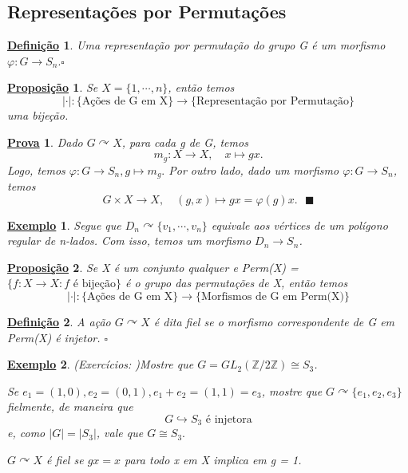 \documentclass{article}
\newtheorem*{def*}{\underline{Defini\c c\~ao}}
\newtheorem*{prop*}{\underline{Proposi\c c\~ao}}
\newtheorem{example*}{\underline{Exemplo}}
\newtheorem*{proof*}{\underline{Prova}}
\renewcommand\qedsymbol{$\blacksquare$}
\begin{document}
\subsection{Representa\c cões por Permuta\c cões}
 \begin{def*}
   Uma representa\c cão por permuta\c cão do grupo G é um morfismo \(\varphi :G\rightarrow S_{n}. \square\)
 \end{def*}
\begin{prop*}
  Se \(X = \{1, \cdots, n\}\), então temos 
    \[
      |\cdot |:\biggl\{\text{A\c cões de G em X}\biggr\}\rightarrow \biggl\{\text{Representa\c cão por Permuta\c cão}\biggr\}
    \]
    uma bije\c cão.
\end{prop*}
\begin{proof*}
  Dado \(G \curvearrowright X\), para cada g de G, temos 
    \[
      m_{g}:X\rightarrow X,\quad x\mapsto gx.
    \]
  Logo, temos \(\varphi :G\rightarrow S_{n}, g\mapsto m_{g}.\) Por outro lado, dado um morfismo \(\varphi :G\rightarrow S_{n}\), temos 
    \[
      G\times{}X\rightarrow X,\quad (g, x)\mapsto gx = \varphi (g)x.\text{ \qedsymbol}
    \]
\end{proof*}
\begin{example*}
  Segue que \(D_{n}\curvearrowright \{v_{1}, \cdots, v_{n}\}\) equivale aos vértices de um polígono regular de n-lados. Com isso, temos um morfismo
  \(D_{n}\rightarrow S_{n}\).
\end{example*}
\begin{prop*}
  Se X é um conjunto qualquer e Perm(X) = \(\{f:X\rightarrow X: f \text{ é bije\c cão}\}\) é o grupo das permuta\c cões de X, então temos 
    \[
      |\cdot |:\biggl\{\text{A\c cões de G em X}\biggr\}\rightarrow\biggl\{\text{Morfismos de G em Perm(X)}\biggr\}
    \]
\end{prop*}
\begin{def*}
  A a\c cão \(G \curvearrowright X\) é dita fiel se o morfismo correspondente de G em Perm(X) é injetor. \(\square\)
\end{def*}
\begin{example*}
  (Exercícios: )Mostre que \(G = GL_{2}(\mathbb{Z}/2 \mathbb{Z})\cong{S_{3}}\).

  Se \(e_{1}=(1, 0), e_{2} = (0, 1), e_{1}+e_{2} = (1, 1) = e_{3}\), mostre que \(G \curvearrowright \{e_{1}, e_{2}, e_{3}\}\) fielmente, de maneira que 
    \[
      G\hookrightarrow S_{3}\text{ é injetora}
    \]
    e, como \(|G| = |S_{3}|\), vale que \(G\cong{S_{3}.}\)

    \(G \curvearrowright X\) é fiel se \(gx=x\) para todo x em X implica em g = 1.
\end{example*}
\end{document}
